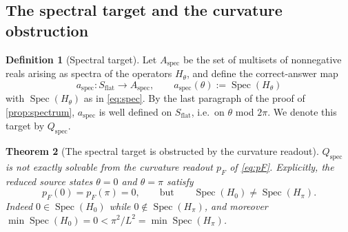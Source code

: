 \documentclass[11pt,reqno]{amsart}
\theoremstyle{plain}
\newtheorem{theorem}{Theorem}[section]
\theoremstyle{definition}
\newtheorem{definition}[theorem]{Definition}
\newcommand{\Src}{S}
\newcommand{\Spec}{\operatorname{Spec}}
\begin{document}
\subsection{The spectral target and the curvature obstruction}

\begin{definition}[Spectral target]\label{def:spectral-target}
Let $A_{\mathrm{spec}}$ be the set of multisets of nonnegative reals arising as spectra of the
operators $H_\theta$, and define the correct-answer map
\begin{equation}\label{eq:aspec}
a_{\mathrm{spec}}\colon\Src_{\mathrm{flat}}\longrightarrow A_{\mathrm{spec}},
\qquad
a_{\mathrm{spec}}(\theta):=\Spec(H_\theta)
\end{equation}
with $\Spec(H_\theta)$ as in \eqref{eq:spec}. By the last paragraph of the proof of
\cref{prop:spectrum}, $a_{\mathrm{spec}}$ is well defined on $\Src_{\mathrm{flat}}$, i.e.\ on
$\theta$ mod $2\pi$. We denote this target by $Q_{\mathrm{spec}}$.
\end{definition}

\begin{theorem}[The spectral target is obstructed by the curvature
readout]\label{thm:curvature-obstruction}
$Q_{\mathrm{spec}}$ is not exactly solvable from the curvature readout $p_F$ of \eqref{eq:pF}.
Explicitly, the reduced source states $\theta=0$ and $\theta=\pi$ satisfy
\begin{equation}\label{eq:zero-pi}
p_F(0)=p_F(\pi)=0,
\qquad\text{but}\qquad
\Spec(H_0)\neq\Spec(H_\pi).
\end{equation}
Indeed $0\in\Spec(H_0)$ while $0\notin\Spec(H_\pi)$, and moreover
$\min\Spec(H_0)=0<\pi^2/L^2=\min\Spec(H_\pi)$.
\end{theorem}
\end{document}

